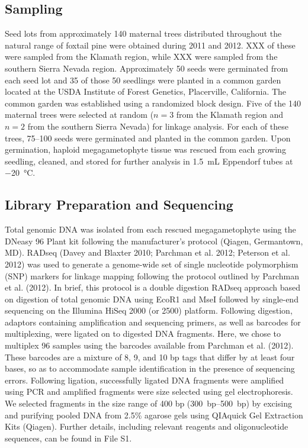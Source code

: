 \documentclass[11pt]{article}
\begin{document}
\subsection*{Sampling}
Seed lots from approximately 140 maternal trees distributed throughout the natural range 
of foxtail pine were obtained during 2011 and 2012. XXX of these were sampled from the 
Klamath region, while XXX were sampled from the southern Sierra Nevada region. Approximately 
50 seeds were germinated from each seed lot and 35 of those 50 seedlings were planted in a 
common garden located at the USDA Institute of Forest Genetics, Placerville, California. The 
common garden was established using a randomized block design.
Five of the 140 maternal trees were selected at random ($n = 3$ from the Klamath region and $n = 2$ from 
the southern Sierra Nevada) for linkage analysis. For each of these trees, \SIrange{75}{100}{} 
seeds were germinated and planted in the common garden. Upon germination, haploid 
megagametophyte tissue was rescued from each growing seedling, cleaned, and stored for further 
analysis in \SI{1.5}{\mL} Eppendorf tubes at \SI{-20}{\celsius}.


\subsection*{Library Preparation and Sequencing}
Total genomic DNA was isolated from each rescued megagametophyte using the DNeasy 96 Plant 
kit following the manufacturer’s protocol (Qiagen, Germantown, MD). RADseq (Davey and Blaxter 2010; Parchman et al. 2012; Peterson et al. 2012) 
was used to generate a genome-wide set of 
single nucleotide polymorphism (SNP) markers for linkage mapping following the protocol 
outlined by Parchman et al. (2012). In brief, this protocol is a double digestion RADseq 
approach based on digestion of total genomic DNA using EcoR1 and MseI followed by single-end 
sequencing on the Illumina HiSeq 2000 (or 2500) platform. Following digestion, adaptors 
containing amplification and sequencing primers, as well as barcodes for multiplexing, 
were ligated on to digested DNA fragments. Here, we chose to multiplex 96 samples using the 
barcodes available from Parchman et al. (2012). These barcodes are a mixture of 8, 9, and 
10 bp tags that differ by at least four bases, so as to accommodate sample identification in the 
presence of sequencing errors. Following ligation, successfully ligated DNA fragments were 
amplified using PCR and amplified fragments were size selected using gel electrophoresis. We selected 
fragments in the size range of 400 bp (\SIrange{300}{500}{bp}) by excising and purifying pooled DNA from 2.5\% 
agarose gels using QIAquick Gel Extraction Kits (Qiagen). Further details, including relevant reagents and 
oligonucleotide sequences, can be found in File S1. 
\end{document}
